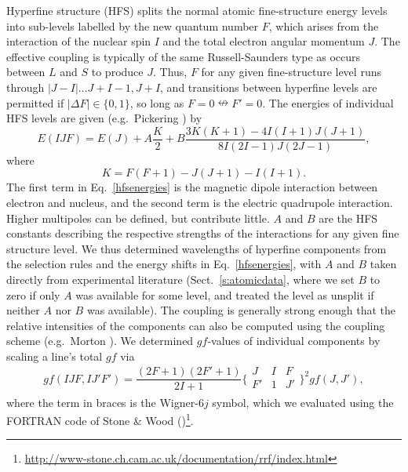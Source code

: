 \documentclass[traditabstract]{aa}
\begin{document}
Hyperfine structure (HFS) splits the normal atomic fine-structure energy levels into sub-levels labelled by the new quantum
number $F$, which arises from the interaction of the nuclear spin $I$ and the total electron angular momentum $J$.
The effective coupling is typically of the same Russell-Saunders type as occurs between $L$ and $S$ to produce $J$.
Thus, $F$ for any given fine-structure level runs through $|J-I|\dots J+I-1, J+I$, and transitions between hyperfine
levels are permitted if $|\Delta F|\in\{0,1\}$, so long as $F=0\nleftrightarrow F'=0$.  The energies of individual HFS
levels are given (e.g.\ Pickering \cite{Pickering96a}) by
\begin{equation}
\label{hfsenergies}
E(IJF) = E(J) + A\frac{K}{2} + B\frac{3K(K+1)-4I(I+1)J(J+1)}{8I(2I-1)J(2J-1)},
\end{equation}
where
\begin{equation}
\label{K}
K = F(F+1)-J(J+1)-I(I+1).
\end{equation}
The first term in Eq.~\ref{hfsenergies} is the magnetic dipole interaction between electron and nucleus, and the second
term is the electric quadrupole interaction.  Higher multipoles can be defined, but contribute little.  $A$ and $B$ are
the HFS constants describing the respective strengths of the interactions for any given fine structure level.  We thus
determined wavelengths of hyperfine components from the selection rules and the energy shifts in Eq.~\ref{hfsenergies},
with $A$ and $B$ taken directly from experimental literature (Sect.~\ref{s:atomicdata}, where we set $B$ to zero if only $A$ was available for some level, and treated the level as unsplit if neither $A$ nor $B$ was available).  The coupling is generally strong enough that the relative intensities of the components
can also be computed using the coupling scheme (e.g.\ Morton \cite{Morton03}).  We determined $gf$-values of individual
components by scaling a line's total $gf$ via
\begin{equation}
\label{hfsgfs}
gf(IJF,IJ'F') = \frac{(2F+1)(2F'+1)}{2I+1}\bigg\{\begin{array}{ccc}J&I&F\\F'&1&J'\\\end{array}\bigg\}^2gf(J,J'),
\end{equation}
where the term in braces is the Wigner-6$j$ symbol, which we evaluated using the FORTRAN code of
Stone \& Wood (\cite{Stone80})\footnote{\href{http://www-stone.ch.cam.ac.uk/documentation/rrf/index.html}
{http://www-stone.ch.cam.ac.uk/documentation/rrf/index.html}}.
\end{document}
